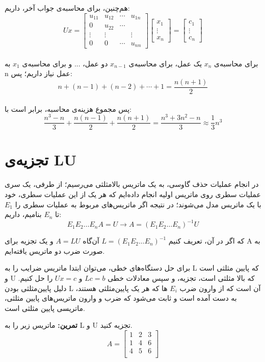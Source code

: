 هم‌چنین، برای محاسبه‌ی جواب آخر، داریم:
$$Ux = \begin{bmatrix}u_{11}&u_{12}&\cdots&u_{1n}\\0&u_{22}&\cdots\\\vdots&\vdots&&\vdots\\0&0&\cdots&u_{nn}\end{bmatrix} \begin{bmatrix}x_{1}\\\vdots\\ x_{n}\end{bmatrix} = \begin{bmatrix}c_{1}\\\vdots\\c_{n}\end{bmatrix} $$ \\
برای محاسبه‌ی $x_{n}$ یک عمل، برای محاسبه‌ی $x_{n-1}$ دو عمل، ... و برای محاسبه‌ی $x_{1}$ به n عمل نیاز داریم؛ پس:\\
$$n + (n-1) + (n-2) + \cdots + 1 = \dfrac{n(n+1)}{2}$$\\
پس مجموع هزینه‌ی محاسبه، برابر است با:\\
$$\dfrac{n^3-n}{3} + \dfrac{n(n-1)}{2} + \dfrac{n(n+1)}{2} = \dfrac{n^3 + 3n^2 - n}{3} \approx \dfrac{1}{3} n^3$$




\section{تجزیه‌ی LU}

در انجام عملیات حذف گاوسی، به یک ماتریس بالامثلثی می‌رسیم؛ از طرفی، یک سری عملیات سطری روی ماتریس اولیه انجام داده‌ایم که هر یک از این عملیات سطری، خود با یک ماتریس مدل می‌شوند؛ در نتیجه اگر ماتریس‌های مربوط به عملیات سطری را $E_1$ تا $E_n$ بنامیم، داریم:
$$E_1 E_2 \dots E_n A = U \to A = (E_1 E_2 \dots E_n)^{-1} U$$

که اگر در آن، تعریف کنیم $L = (E_1 E_2 \dots E_n)^{-1}$ آن‌گاه $A = LU$ و یک تجزیه برای A به صورت ضرب دو ماتریس یافته‌ایم.

برای حل دستگاه‌های خطی، می‌توان ابتدا ماتریس ضرایب را به L که پایین مثلثی است و U که بالا مثلثی است، تجزیه، و سپس معادلات خطی $Lc = b$ و $Ux = c$ را حل کنیم. دلیل پایین‌مثلثی بودن L آن است که از وارون ضرب $E_i$ ها که هر یک پایین‌مثلثی هستند، به دست آمده است و ثابت می‌شود که ضرب و وارون ماتریس‌های پایین‌ مثلثی، ماتریسی پایین‌ مثلثی است.

\textbf{تمرین:}
ماتریس زیر را به L و U تجزیه کنید.
$$A = \begin{bmatrix}1& 2 & 3\\ 1 & 4 & 6 \\4 & 5 & 6\\\end{bmatrix}$$ \\

